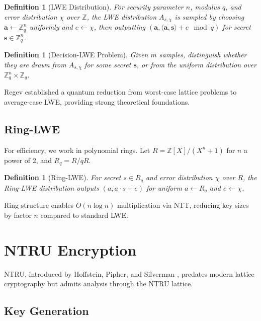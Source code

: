 \documentclass[11pt,a4paper]{article}
\newtheorem{definition}[theorem]{Definition}
\begin{document}
\begin{definition}[LWE Distribution]
For security parameter $n$, modulus $q$, and error distribution $\chi$ over $\mathbb{Z}$, the LWE distribution $A_{s,\chi}$ is sampled by choosing $\mathbf{a} \leftarrow \mathbb{Z}_q^n$ uniformly and $e \leftarrow \chi$, then outputting $(\mathbf{a}, \langle \mathbf{a}, \mathbf{s} \rangle + e \mod q)$ for secret $\mathbf{s} \in \mathbb{Z}_q^n$.
\end{definition}

\begin{definition}[Decision-LWE Problem]
Given $m$ samples, distinguish whether they are drawn from $A_{s,\chi}$ for some secret $\mathbf{s}$, or from the uniform distribution over $\mathbb{Z}_q^n \times \mathbb{Z}_q$.
\end{definition}

Regev \cite{regev2009} established a quantum reduction from worst-case lattice problems to average-case LWE, providing strong theoretical foundations.

\subsection{Ring-LWE}

For efficiency, we work in polynomial rings. Let $R = \mathbb{Z}[X]/(X^n + 1)$ for $n$ a power of 2, and $R_q = R/qR$.

\begin{definition}[Ring-LWE]
For secret $s \in R_q$ and error distribution $\chi$ over $R$, the Ring-LWE distribution outputs $(a, a \cdot s + e)$ for uniform $a \leftarrow R_q$ and $e \leftarrow \chi$.
\end{definition}

Ring structure enables $O(n \log n)$ multiplication via NTT, reducing key sizes by factor $n$ compared to standard LWE.

\section{NTRU Encryption}

NTRU, introduced by Hoffstein, Pipher, and Silverman \cite{ntru1998}, predates modern lattice cryptography but admits analysis through the NTRU lattice.

\subsection{Key Generation}
\end{document}
